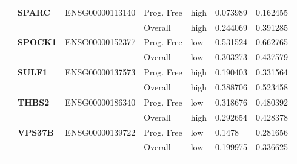 \begin{spacing}{1}
{\begin{longtable}{|>{\bfseries}p{2cm}|>{\bfseries}p{1.9cm}|p{2.8cm}|p{2cm}|p{2cm}|p{1.5cm}|p{1.5cm}|}
             & SPARC    & ENSG00000113140 & Prog. Free & high & 0.073989 & 0.162455 \\
            \hhline{~~~----}
             &          &                 & Overall    & high & 0.244069 & 0.391285 \\
            \hhline{~======}
             & SPOCK1   & ENSG00000152377 & Prog. Free & low  & 0.531524 & 0.662765 \\
            \hhline{~~~----}
             &          &                 & Overall    & low  & 0.303273 & 0.437579 \\
            \hhline{~======}
             & SULF1    & ENSG00000137573 & Prog. Free & high & 0.190403 & 0.331564 \\
            \hhline{~~~----}
             &          &                 & Overall    & high & 0.388706 & 0.523458 \\
            \hhline{~======}
             & THBS2    & ENSG00000186340 & Prog. Free & low  & 0.318676 & 0.480392 \\
            \hhline{~~~----}
             &          &                 & Overall    & high & 0.292654 & 0.428378 \\
            \hhline{~======}
             & VPS37B   & ENSG00000139722 & Prog. Free & low  & 0.1478   & 0.281656 \\
            \hhline{~~~----}
             &          &                 & Overall    & low  & 0.199975 & 0.336625 \\
            \hhline{~======}
            \hline



\end{longtable}}
\end{spacing}
